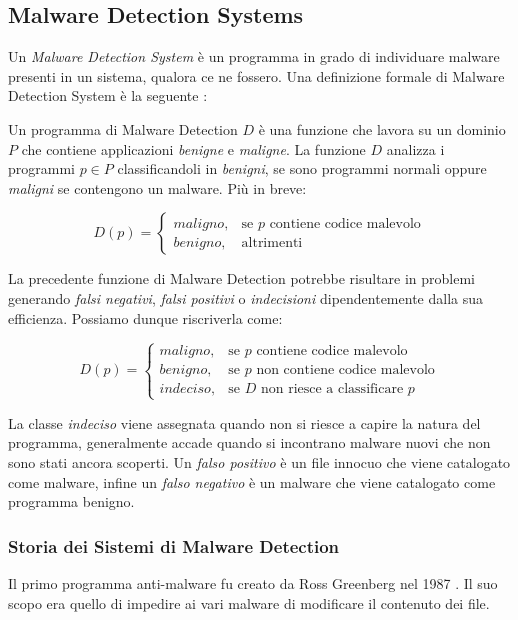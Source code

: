 \subsection{Malware Detection Systems}
Un \textit{Malware Detection System} è un programma in grado di individuare malware presenti in un sistema, qualora ce ne fossero. Una definizione formale di Malware Detection System  è la seguente \cite{malware}:

Un programma di Malware Detection \(D\) è una funzione che lavora su un dominio \(P\) che contiene applicazioni \textit{benigne} e \textit{maligne}. La funzione \(D\) analizza i programmi \(p \in P\) classificandoli in \textit{benigni}, se sono programmi normali oppure \textit{maligni} se contengono un malware. Più in breve:

\[
    D(p) = \begin{cases}
                maligno, & \mbox{se } p \mbox{ contiene codice malevolo} \\ 
                benigno, & \mbox{altrimenti } 
            \end{cases}
\]

La precedente funzione di Malware Detection potrebbe risultare in problemi generando \textit{falsi negativi}, \textit{falsi positivi} o \textit{indecisioni} dipendentemente dalla sua efficienza. Possiamo dunque riscriverla come:

\[
    D(p) = \begin{cases}
                maligno, & \mbox{se } p \mbox{ contiene codice malevolo} \\ 
                benigno, & \mbox{se } p \mbox{ non contiene codice malevolo} \\
                indeciso,& \mbox{se } D \mbox{ non riesce a classificare } p
            \end{cases}
\]

La classe \textit{indeciso} viene assegnata quando non si riesce a capire la natura del programma, generalmente accade quando si incontrano malware nuovi che non sono stati ancora scoperti. Un \textit{falso positivo} è un file innocuo che viene catalogato come malware, infine un \textit{falso negativo} è un malware che viene catalogato come programma benigno.

\subsubsection{Storia dei Sistemi di Malware Detection}
Il primo programma anti-malware fu  creato da Ross Greenberg nel 1987 \cite{malware}. Il suo scopo era quello di impedire ai vari malware di modificare il contenuto dei file.

